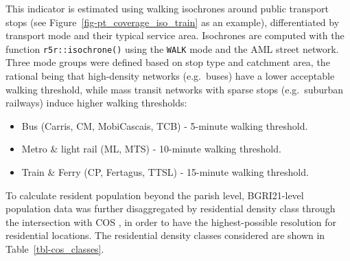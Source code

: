 \documentclass[
  authoryear,
  review,
  1p]{elsarticle}
\begin{document}
This indicator is estimated using walking isochrones around public
transport stops (see Figure~\ref{fig-pt_coverage_iso_train} as an
example), differentiated by transport mode and their typical service
area. Isochrones are computed with the function
\texttt{r5r::isochrone()} using the \texttt{WALK} mode and the AML
street network. Three mode groups were defined based on stop type and
catchment area, the rational being that high-density networks
(e.g.~buses) have a lower acceptable walking threshold, while mass
transit networks with sparse stops (e.g.~suburban railways) induce
higher walking thresholds:

\begin{itemize}
\item
  Bus (Carris, CM, MobiCascais, TCB) - 5-minute walking threshold.
\item
  Metro \& light rail (ML, MTS) - 10-minute walking threshold.
\item
  Train \& Ferry (CP, Fertagus, TTSL) - 15-minute walking threshold.
\end{itemize}

To calculate resident population beyond the parish level, BGRI21-level
population data \citep{INE_Census2021} was further disaggregated by
residential density class through the intersection with COS
\citep{COS_2023}, in order to have the highest-possible resolution for
residential locations. The residential density classes considered are
shown in Table~\ref{tbl-cos_classes}.
\end{document}

